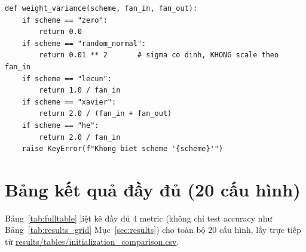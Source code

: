 \documentclass[12pt,a4paper]{article}
\begin{document}
\begin{lstlisting}[caption={Cong thuc Var(W) cho tung scheme -- src/initialization.py (nguyên văn Bảng~\ref{tab:schemes})}]
def weight_variance(scheme, fan_in, fan_out):
    if scheme == "zero":
        return 0.0
    if scheme == "random_normal":
        return 0.01 ** 2       # sigma co dinh, KHONG scale theo fan_in
    if scheme == "lecun":
        return 1.0 / fan_in
    if scheme == "xavier":
        return 2.0 / (fan_in + fan_out)
    if scheme == "he":
        return 2.0 / fan_in
    raise KeyError(f"Khong biet scheme '{scheme}'")
\end{lstlisting}

\section{Bảng kết quả đầy đủ (20 cấu hình)}
\label{app:fulltable}

Bảng~\ref{tab:fulltable} liệt kê đầy đủ 4 metric (không chỉ test accuracy
như Bảng~\ref{tab:results_grid} Mục~\ref{sec:results}) cho toàn bộ $20$
cấu hình, lấy trực tiếp từ \url{results/tables/initialization_comparison.csv}.
\end{document}
